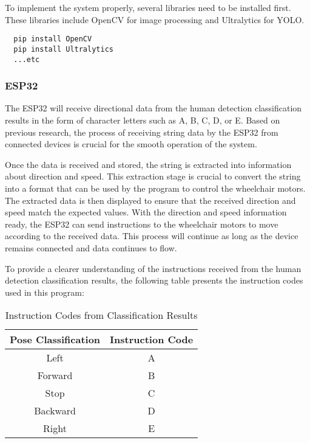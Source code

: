 To implement the system properly, several libraries need to be installed first. These libraries include OpenCV for image processing and Ultralytics for YOLO.

\begin{lstlisting}
  pip install OpenCV
  pip install Ultralytics
  ...etc
\end{lstlisting}

\vspace{5pt}
\subsubsection{ESP32}
\label{subsubsec:ESP32}

The ESP32 will receive directional data from the human detection classification results in the form of character letters such as A, B, C, D, or E. Based on previous research, the process of receiving string data by the ESP32 from connected devices is crucial for the smooth operation of the system.

Once the data is received and stored, the string is extracted into information about direction and speed. This extraction stage is crucial to convert the string into a format that can be used by the program to control the wheelchair motors. The extracted data is then displayed to ensure that the received direction and speed match the expected values. With the direction and speed information ready, the ESP32 can send instructions to the wheelchair motors to move according to the received data. This process will continue as long as the device remains connected and data continues to flow.

To provide a clearer understanding of the instructions received from the human detection classification results, the following table presents the instruction codes used in this program:

\begin{table}[H]
\centering
\caption{Instruction Codes from Classification Results}
\begin{tabular}{|c|c|}
\hline
\textbf{Pose Classification} & \textbf{Instruction Code} \\
\hline
Left & A \\
\hline
Forward & B \\
\hline
Stop & C \\
\hline
Backward & D \\
\hline
Right & E \\
\hline
\end{tabular}
\end{table}

